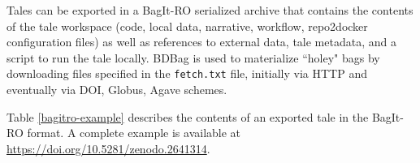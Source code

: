 \documentclass[conference]{IEEEtran}
\begin{document}
Tales can be exported in a BagIt-RO serialized archive that contains the contents of the tale workspace (code, local data, narrative, workflow, repo2docker configuration files) as well as references to external data, tale metadata, and a script to run the tale locally. BDBag \cite{chard2016} is used to materialize ``holey" bags by downloading files specified in the \texttt{fetch.txt} file, initially via HTTP and eventually via DOI, Globus, Agave schemes.

Table \ref{bagitro-example} describes the contents of an exported tale in the BagIt-RO format. A complete example is available at \href{https://doi.org/10.5281/zenodo.2641314}{https://doi.org/10.5281/zenodo.2641314}.
\end{document}
